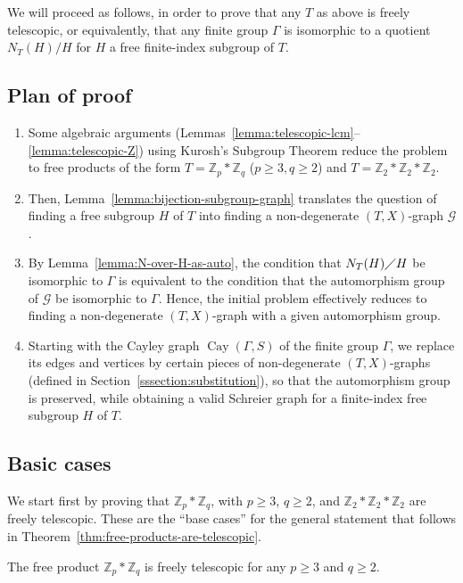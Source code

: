 \documentclass[ALCO,ThmDefs,Unicode,epreuves]{cedram}
\newcommand{\ZZ}{\mathbb{Z}}
\newcommand{\cG}{\mathcal{G}}
\DeclareMathOperator{\Cay}{Cay}
\begin{document}
We will proceed as follows, in order to prove that any $T$ as above is freely telescopic, or equivalently, that any finite group ${\Gamma}$ is isomorphic to a quotient $N_T(H)/H$ for $H$ a free finite-index subgroup of $T$.

\subsection{Plan of proof}\label{proof-plan}
\begin{enumerate}
\item Some algebraic arguments (Lemmas~\ref{lemma:telescopic-lcm}--\ref{lemma:telescopic-Z}) using Kurosh's Subgroup Theorem reduce the problem to free products of the form $T=\ZZ_p*\ZZ_q$ ($p \geq 3, q \geq 2$) and $T=\ZZ_2*\ZZ_2*\ZZ_2$.
\item Then, Lemma~\ref{lemma:bijection-subgroup-graph} translates the question of finding a free subgroup $H$ of $T$ into finding a non-degenerate $(T,X)$-graph $\cG$.
\item By Lemma~\ref{lemma:N-over-H-as-auto}, the condition that $N_T(H)\diagup H$ be isomorphic to ${\Gamma}$ is equivalent to the condition that the automorphism group of $\cG$ be isomorphic to ${\Gamma}$. Hence, the initial problem effectively reduces to finding a non-degenerate $(T,X)$-graph with a given automorphism group.
\item Starting with the Cayley graph $\Cay({\Gamma},S)$ of the finite group $\Gamma$, we replace its edges and vertices by certain pieces of non-degenerate $(T,X)$-graphs (defined in Section~\ref{sssection:substitution}), so that the automorphism group is preserved, while obtaining a valid Schreier graph for a finite-index free subgroup $H$ of $T$. 
\end{enumerate}

\subsection{Basic cases} \label{section:basiccases}

We start first by proving that $\ZZ_p*\ZZ_q$, with $p \geq 3$, $q \geq 2$, and $\ZZ_2*\ZZ_2*\ZZ_2$ are freely telescopic. These are the ``base cases'' for the general statement that follows in Theorem~\ref{thm:free-products-are-telescopic}.

\begin{prop}\label{prop:ZpZq-telescopic}
The free product $\ZZ_p \ast \ZZ_q$ is freely telescopic for any $p \geq 3$ and $q \geq 2$.
\end{prop}
\end{document}
